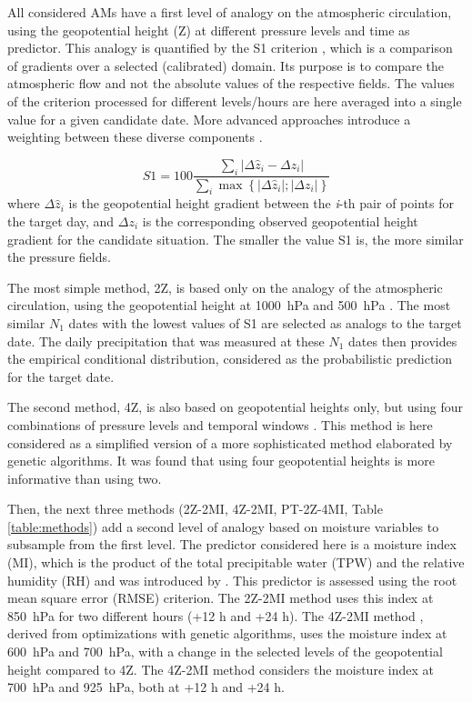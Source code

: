 \documentclass[alpha-refs]{wiley-article}
\begin{document}
All considered AMs have a first level of analogy on the atmospheric circulation, using the geopotential height (Z) at different pressure levels and time as predictor. This analogy is quantified by the S1 criterion \citep[Eq.\ \ref{eq:S1}, ][]{Teweles1954, Brown2012}, which is a comparison of gradients over a selected (calibrated) domain. Its purpose is to compare the atmospheric flow and not the absolute values of the respective fields. The values of the criterion processed for different levels/hours are here averaged into a single value for a given candidate date. More advanced approaches introduce a weighting between these diverse components \citep{Horton2017a}.

\begin{equation}
	\label{eq:S1}
	S1=100 \frac{\sum_{i} \vert \Delta\hat{z}_{i} - \Delta z_{i} \vert}{\sum_{i} \max\left\lbrace \vert \Delta\hat{z}_{i} \vert; \vert \Delta z_{i} \vert \right\rbrace }
\end{equation}
where $\Delta \hat{z}_{i}$ is the geopotential height gradient between the \textit{i}-th pair of points for the target day, and $\Delta z_{i}$ is the corresponding observed geopotential height gradient for the candidate situation. The smaller the value S1 is, the more similar the pressure fields.

The most simple method, 2Z, is based only on the analogy of the atmospheric circulation, using the geopotential height at 1000~hPa and 500~hPa \citep{Bontron2004}. The most similar $N_{1}$ dates with the lowest values of S1 are selected as analogs to the target date. The daily precipitation that was measured at these $N_{1}$ dates then provides the empirical conditional distribution, considered as the probabilistic prediction for the target date.

The second method, 4Z, is also based on geopotential heights only, but using four combinations of pressure levels and temporal windows \citep{Horton2018a}. This method is here considered as a simplified version of a more sophisticated method elaborated by genetic algorithms. It was found that using four geopotential heights is more informative than using two.

Then, the next three methods (2Z-2MI, 4Z-2MI, PT-2Z-4MI, Table \ref{table:methods}) add a second level of analogy based on moisture variables to subsample from the first level. The predictor considered here is a moisture index (MI), which is the product of the total precipitable water (TPW) and the relative humidity (RH) and was introduced by \citet{Bontron2004}. This predictor is assessed using the root mean square error (RMSE) criterion. The 2Z-2MI method \citep{Bontron2004} uses this index at 850~hPa for two different hours (+12 h and +24 h). The 4Z-2MI method \citep{Horton2018a}, derived from optimizations with genetic algorithms, uses the moisture index at 600~hPa and 700~hPa, with a change in the selected levels of the geopotential height compared to 4Z. The 4Z-2MI method \citep{BenDaoud2016} considers the moisture index at 700~hPa and 925~hPa, both at +12 h and +24 h.
\end{document}
